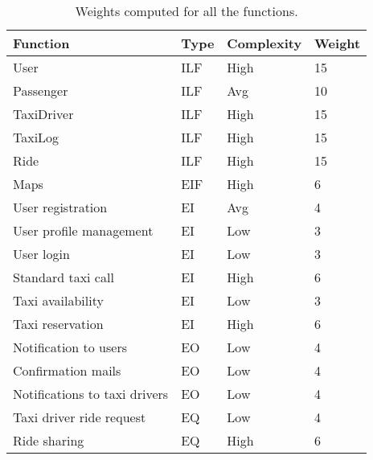\begin{table}
    \centering
    \begin{tabular}{| l | l | l | l |}
        \hline
        \textbf{Function} & \textbf{Type} & \textbf{Complexity}  & \textbf{Weight} \\
        \hline
        User       & ILF     & High     & 15     \\
        Passenger         & ILF     & Avg     & 10     \\
        TaxiDriver        & ILF     & High     & 15    \\
        TaxiLog     & ILF     & High    &    15 \\
        Ride & ILF     & High     & 15    \\
        Maps & EIF     & High     & 6    \\
        User registration & EI     & Avg     & 4    \\
        User profile management & EI     & Low     & 3    \\
        User login & EI     & Low     & 3    \\
        Standard taxi call & EI     & High     & 6    \\
        Taxi availability & EI     & Low     & 3    \\
        Taxi reservation & EI     & High     & 6    \\
        Notification to users & EO     & Low     & 4    \\
        Confirmation mails & EO     & Low     & 4    \\
        Notifications to taxi drivers & EO     & Low     & 4    \\
        Taxi driver ride request & EQ     & Low     & 4    \\
        Ride sharing & EQ     & High     & 6    \\
        \hline
    \end{tabular}
    \caption{Weights computed for all the functions.}
    \label{tab:computed-num-weights}
\end{table}
